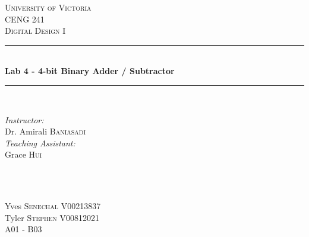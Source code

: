 \documentclass[11pt]{article}
\newcommand{\HRule}{\rule{\linewidth}{0.5mm}}
\begin{document}

\begin{titlepage}

\center
 
\textsc{\LARGE University of Victoria}\\[1cm] 	%
\textsc{\Large CENG 241}\\[0.5cm] 			%
\textsc{\large Digital Design I}\\[0.5cm] 		%


\HRule \\[0.4cm]
{\huge \bfseries Lab 4 - 4-bit Binary Adder / Subtractor}\\[0.2cm] %
\HRule \\[1.5cm]
 
 
\begin{minipage}{0.7\textwidth}
\begin{flushleft} 

\large\emph{Instructor:} \\
Dr. Amirali \textsc{Baniasadi} \\
\vspace{12 pt}
\emph{Teaching Assistant:} \\
Grace \textsc{Hui}

\end{flushleft}
\end{minipage}
~
\begin{minipage}{0.1\textwidth}
\begin{flushright} \large
\vspace{12 pt}
\end{flushright}
\end{minipage}\\[2cm]


\Large Yves \textsc{Senechal}
\large V00213837	\\
\Large Tyler \textsc{Stephen}
\large V00812021	\\
A01 - B03\\[1.5cm] 



\end{titlepage}
\end{document}
